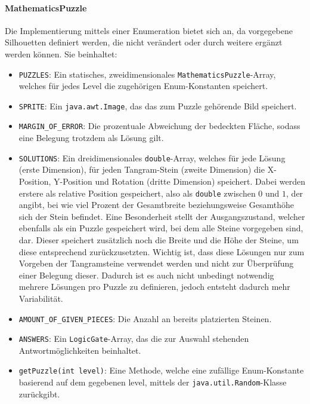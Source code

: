 \paragraph{MathematicsPuzzle} Die Implementierung mittels einer Enumeration bietet sich an, da vorgegebene Silhouetten definiert werden, die nicht verändert oder durch weitere ergänzt werden können.
Sie beinhaltet:

\begin{sloppypar}
    \begin{itemize}
        \item \texttt{PUZZLES}: Ein statisches, zweidimensionales \texttt{MathematicsPuzzle}-Array, welches für jedes Level die zugehörigen Enum-Konstanten speichert.
        \item \texttt{SPRITE}: Ein \texttt{java.awt.Image}, das das zum Puzzle gehörende Bild speichert.
        \item \texttt{MARGIN\_OF\_ERROR}: Die prozentuale Abweichung der bedeckten Fläche, sodass eine Belegung trotzdem als Lösung gilt.
        \item \texttt{SOLUTIONS}: Ein dreidimensionales \texttt{double}-Array, welches für jede Lösung (erste Dimension), für jeden Tangram-Stein (zweite Dimension) die X-Position, Y-Position und Rotation (dritte Dimension) speichert.
            Dabei werden erstere als relative Position gespeichert, also als \texttt{double} zwischen $0$ und $1$, der angibt, bei wie viel Prozent der Gesamtbreite beziehungsweise Gesamthöhe sich der Stein befindet.
            Eine Besonderheit stellt der Ausgangszustand, welcher ebenfalls als ein Puzzle gespeichert wird, bei dem alle Steine vorgegeben sind, dar.
            Dieser speichert zusätzlich noch die Breite und die Höhe der Steine, um diese entsprechend zurückzusetzten.
            Wichtig ist, dass diese Lösungen nur zum Vorgeben der Tangramsteine verwendet werden und nicht zur Überprüfung einer Belegung dieser.
            Dadurch ist es auch nicht unbedingt notwendig mehrere Lösungen pro Puzzle zu definieren, jedoch entsteht dadurch mehr Variabilität.
        \item \texttt{AMOUNT\_OF\_GIVEN\_PIECES}: Die Anzahl an bereits platzierten Steinen.
        \item \texttt{ANSWERS}: Ein \texttt{LogicGate}-Array, das die zur Auswahl stehenden Antwortmöglichkeiten beinhaltet.
        \item \texttt{getPuzzle(int level)}: Eine Methode, welche eine zufällige Enum-Konstante basierend auf dem gegebenen level, mittels der \texttt{java.util.Random}-Klasse zurückgibt.

\end{itemize}
\end{sloppypar}
